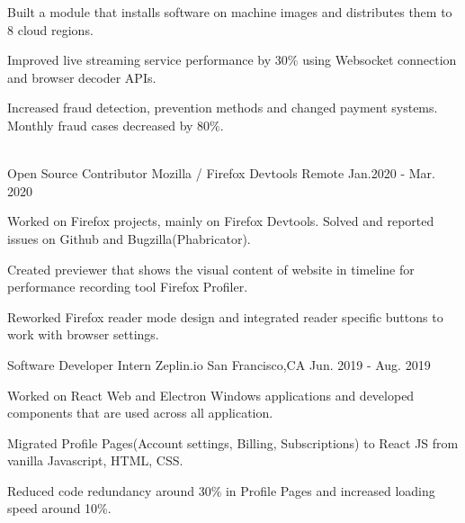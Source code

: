 \begin{cventries}
{\begin{cvitems}
        \item {Built a module that installs software on machine images and distributes them to 8 cloud regions.}
		\item {Improved live streaming service performance by 30\% using Websocket connection and browser decoder APIs.}
		\item {Increased fraud detection, prevention methods and changed payment systems. Monthly fraud cases decreased by 80\%.}
      \end{cvitems}
    }
\\
  \cvopenentry
   {Open Source Contributor} %
    {Mozilla / Firefox Devtools} %
    {Remote} %
    {Jan.2020 - Mar. 2020} %
    {
      \begin{cvitems} %
        \item {Worked on Firefox projects, mainly on Firefox Devtools. Solved and reported issues on Github and Bugzilla(Phabricator).}
        \item {Created previewer that shows the visual content of website in timeline for performance recording tool Firefox Profiler.
        \item {Reworked Firefox reader mode design and integrated reader specific buttons to work with browser settings.}
}
      \end{cvitems}
    }
  \cvopenentry
   {Software Developer Intern} %
    {Zeplin.io} %
    {San Francisco,CA} %
    {Jun. 2019 - Aug. 2019} %
    {
      \begin{cvitems} %
        \item {Worked on React Web and Electron Windows applications and developed components that are used across all application.}
		\item {Migrated Profile Pages(Account settings, Billing, Subscriptions) to React JS from vanilla Javascript, HTML, CSS.}
        \item {Reduced code redundancy around 30\% in Profile Pages and increased loading speed around 10\%. }
      \end{cvitems}
    }

\end{cventries}
